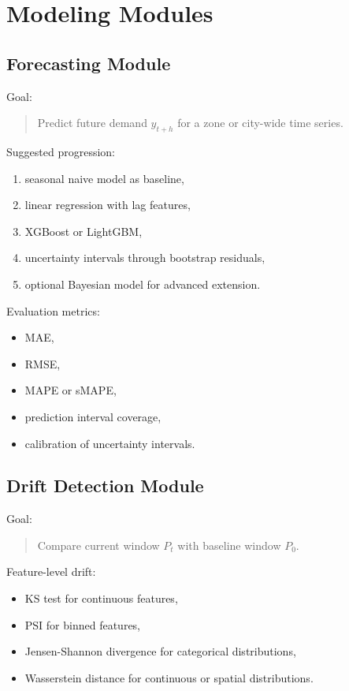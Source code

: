 \documentclass[11pt]{article}
\begin{document}
\section{Modeling Modules}

\subsection{Forecasting Module}

Goal:

\begin{quote}
    Predict future demand $y_{t+h}$ for a zone or city-wide time series.
\end{quote}

Suggested progression:

\begin{enumerate}
    \item seasonal naive model as baseline,
    \item linear regression with lag features,
    \item XGBoost or LightGBM,
    \item uncertainty intervals through bootstrap residuals,
    \item optional Bayesian model for advanced extension.
\end{enumerate}

Evaluation metrics:

\begin{itemize}
    \item MAE,
    \item RMSE,
    \item MAPE or sMAPE,
    \item prediction interval coverage,
    \item calibration of uncertainty intervals.
\end{itemize}

\subsection{Drift Detection Module}

Goal:

\begin{quote}
    Compare current window $P_t$ with baseline window $P_0$.
\end{quote}

Feature-level drift:

\begin{itemize}
    \item KS test for continuous features,
    \item PSI for binned features,
    \item Jensen-Shannon divergence for categorical distributions,
    \item Wasserstein distance for continuous or spatial distributions.
\end{itemize}
\end{document}
